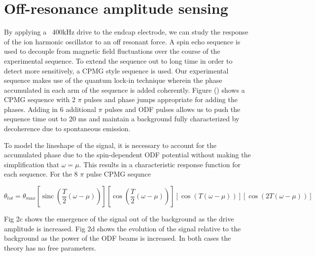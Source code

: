 \documentclass[aps,prl,twocolumn,groupedaddress]{revtex4-1}
\DeclareMathOperator{\sinc}{sinc}
\begin{document}
\section{Off-resonance amplitude sensing}
By applying a ~400kHz drive to the endcap electrode, we can study the response of the ion harmonic oscillator to an off resonant force. A spin echo sequence is used to decouple from magnetic field fluctuations over the course of the experimental sequence. To extend the sequence out to long time in order to detect more sensitively, a CPMG style sequence is used. Our experimental sequence makes use of the quantum lock-in technique wherein the phase accumulated in each arm of the sequence is added coherently. Figure () shows a CPMG sequence with 2 $\pi$ pulses and phase jumps appropriate for adding the phases. Adding in 6 additional $\pi$ pulses and ODF pulses allows us to push the sequence time out to 20 ms and maintain a background fully characterized by decoherence due to spontaneous emission.

To model the lineshape of the signal, it is necessary to account for the accumulated phase due to the spin-dependent ODF potential without making the simplification that $ \omega = \mu $. This results in a characteristic response function for each sequence. For the 8 $\pi$ pulse CPMG sequnce

\begin{widetext}
\begin{equation}
\theta_{tot} = \theta_{max} \left[ \sinc \left( \frac{T}{2} \left( \omega-\mu \right) \right) \right] 
\left[ \cos \left( \frac{T}{2} \left( \omega - \mu \right) \right) \right] \left[ \cos(T(\omega - \mu)) \right] \left[ \cos(2T(\omega - \mu)) \right] 
\end{equation}
\end{widetext}
Fig 2c shows the emergence of the signal out of the background as the drive amplitude is increased. Fig 2d shows the evolution of the signal relative to the background as the power of the ODF beams is increased. In both cases the theory has no free parameters.
\end{document}
